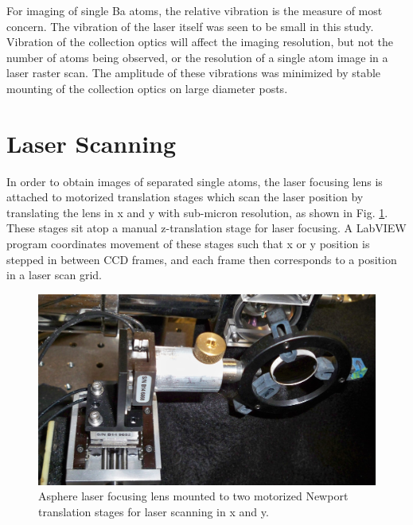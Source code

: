 


For imaging of single Ba atoms, the relative vibration is the measure of most concern.  The vibration of the laser itself was seen to be small in this study.  Vibration of the collection optics will affect the imaging resolution, but not the number of atoms being observed, or the resolution of a single atom image in a laser raster scan.  The amplitude of these vibrations was minimized by stable mounting of the collection optics on large diameter posts.


\section{Laser Scanning}
\label{sec:laserscanning}

In order to obtain images of separated single atoms, the laser focusing lens is attached to motorized translation stages which scan the laser position by translating the lens in x and y with sub-micron resolution, as shown in Fig. \ref{fig:laserStages}.  These stages sit atop a manual z-translation stage for laser focusing.  A LabVIEW program coordinates movement of these stages such that x or y position is stepped in between CCD frames, and each frame then corresponds to a position in a laser scan grid.

\begin{figure} %
        \centering
                \includegraphics[width=.5\textwidth]{figures/stages_2.JPG}
                \caption{Asphere laser focusing lens mounted to two motorized Newport translation stages for laser scanning in x and y.}
\label{fig:laserStages}
\end{figure}

